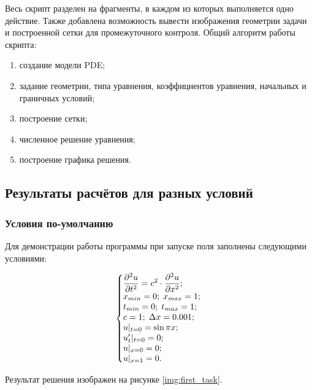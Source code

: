 \documentclass[12pt,a4paper,russian]{report}
\begin{document}
	Весь скрипт разделен на фрагменты, в каждом из которых выполняется одно действие. Также добавлена возможность вывести изображения геометрии задачи и построенной сетки для промежуточного контроля.
	Общий алгоритм работы скрипта:
	
	\begin{enumerate}
		\item создание модели PDE;
		\item задание геометрии, типа уравнения, коэффициентов уравнения, начальных и граничных условий;
		\item построение сетки;
		\item численное решение уравнения;
		\item построение графика решения.
	\end{enumerate}
	
	\newpage
	\subsection{Результаты расчётов для разных условий}
	
	
	\subsubsection{Условия по-умолчанию}
	
	Для демонстрации работы программы при запуске поля заполнены следующими условиями:
	
	\begin{equation*}
		\left\{\begin{array}{@{}l@{}}
			\displaystyle \frac{\partial^2u}{\partial t^2} = c^2 \cdot \frac{\partial^2u}{\partial x^2}; \\
			x_{min} = 0; \; x_{max} = 1; \\
			 t_{min} = 0; \; t_{max} = 1; \\
			 c = 1; \;  \Delta x = 0.001; \\
			u|_{t=0} = \sin \pi x; \\
			u'_{t}|_{t=0} = 0; \\
			u|_{x=0} = 0; \\
			u|_{x=1} = 0.
		\end{array}\right.\,
	\end{equation*}
	
	Результат решения изображен на рисунке \ref{img:first_task}.
	
\end{document}
